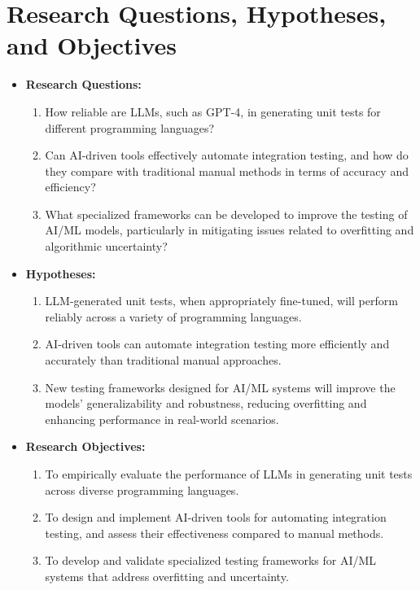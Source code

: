 \documentclass[12pt,a4paper]{article}
\begin{document}
\newpage
\section{Research Questions, Hypotheses, and Objectives}
\begin{itemize}
    \item \textbf{Research Questions:} 
    \begin{enumerate}
    \item How reliable are LLMs, such as GPT-4, in generating unit tests for different programming languages?
    \item Can AI-driven tools effectively automate integration testing, and how do they compare with traditional manual methods in terms of accuracy and efficiency?
    \item What specialized frameworks can be developed to improve the testing of AI/ML models, particularly in mitigating issues related to overfitting and algorithmic uncertainty?
    \end{enumerate}

    \item \textbf{Hypotheses:} 
    \begin{enumerate}
    \item LLM-generated unit tests, when appropriately fine-tuned, will perform reliably across a variety of programming languages.
    \item AI-driven tools can automate integration testing more efficiently and accurately than traditional manual approaches.
    \item New testing frameworks designed for AI/ML systems will improve the models' generalizability and robustness, reducing overfitting and enhancing performance in real-world scenarios.
    \end{enumerate}
    
    \item \textbf{Research Objectives:} 
    \begin{enumerate}
    \item To empirically evaluate the performance of LLMs in generating unit tests across diverse programming languages.
    \item To design and implement AI-driven tools for automating integration testing, and assess their effectiveness compared to manual methods.
    \item To develop and validate specialized testing frameworks for AI/ML systems that address overfitting and uncertainty.
    \end{enumerate}

\end{itemize}
\newpage
\end{document}
